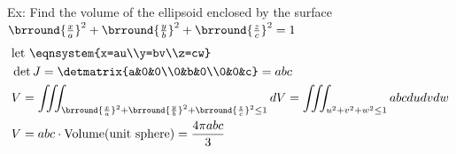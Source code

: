 Ex: Find the volume of the ellipsoid enclosed by the surface $\brround{\frac{x}{a}}^2+\brround{\frac{y}{b}}^2+\brround{\frac{z}{c}}^2=1$
\begin{align*}
    &\text{let }\eqnsystem{x=au\\y=bv\\z=cw}\\
    &\det J=\detmatrix{a&0&0\\0&b&0\\0&0&c}=abc\\
    &V=\iiint_{\brround{\frac{x}{a}}^2+\brround{\frac{y}{b}}^2+\brround{\frac{z}{c}}^2\leq1}dV=\iiint_{u^2+v^2+w^2\leq1}abcdudvdw\\
    &V=abc\cdot\text{Volume(unit sphere)}=\frac{4\pi abc}{3}
\end{align*}